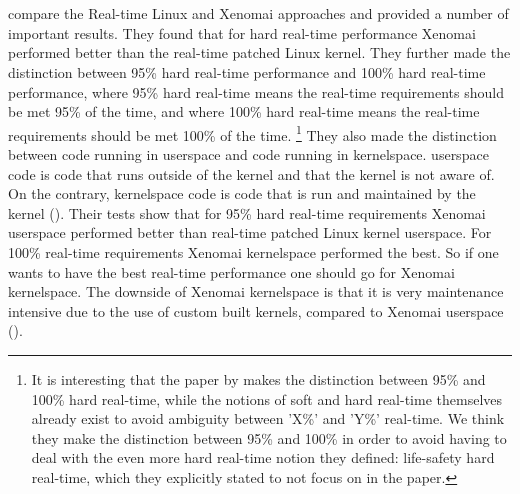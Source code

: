 \documentclass[12pt]{scrreprt}
\begin{document}
\\\\
\cite{brown_martin} compare the Real-time Linux and Xenomai approaches and provided a number of important results. They found that for hard real-time performance Xenomai performed better than the real-time patched Linux kernel. They further made the distinction between 95\% hard real-time performance and 100\% hard real-time performance, where 95\% hard real-time means the real-time requirements should be met 95\% of the time, and where 100\% hard real-time means the real-time requirements should be met 100\% of the time. \footnote{It is interesting that the paper by \citeauthor{brown_martin} makes the distinction between 95\% and 100\% hard real-time, while the notions of soft and hard real-time themselves already exist to avoid ambiguity between 'X\%' and 'Y\%' real-time. We think they make the distinction between 95\% and 100\% in order to avoid having to deal with the even more hard real-time notion they defined: life-safety hard real-time, which they explicitly stated to not focus on in the paper.} They also made the distinction between code running in userspace and code running in kernelspace. userspace code is code that runs outside of the kernel and that the kernel is not aware of. On the contrary, kernelspace code is code that is run and maintained by the kernel (\cite{blocking}). Their tests show that for 95\% hard real-time requirements Xenomai userspace performed better than real-time patched Linux kernel userspace. For 100\% real-time requirements Xenomai kernelspace performed the best. So if one wants to have the best real-time performance one should go for Xenomai kernelspace. The downside of Xenomai kernelspace is that it is very maintenance intensive due to the use of custom built kernels, compared to Xenomai userspace (\cite{brown_martin}).
\end{document}
